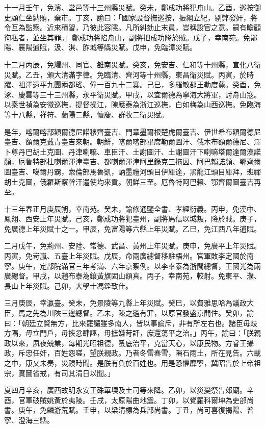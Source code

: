 \begin{pinyinscope}
十一月壬午，免濱、堂邑等十三州縣災賦。癸未，鄭成功將犯舟山。乙酉，巡按御史顧仁坐納賄，棄市。丁亥，諭曰：「國家設督撫巡按，振綱立紀，剔弊發奸，將令互為監察。近來積習，乃彼此容隱。凡所糾劾止末員，豈稱設官之意。嗣有瞻顧徇私者，並坐其罪。」鄭成功將陷舟山，副將把成功降於賊。戊子，幸南苑。免鄖陽、襄陽逋賦，汲、淇、胙城等縣災賦。戊申，免臨漳災賦。

十二月丙辰，免耀州、同官、雒南災賦。癸亥，免安吉、仁和等十州縣，宣化八衛災賦。乙丑，頒大清滿字律。免臨清、齊河等十州縣，東昌衛災賦。丙寅，於時躍、祖澤遠平九團兩都瑤、僮一百九十二寨。己巳，多羅敏郡王勒度薨。癸酉，免涿、慶雲等三十三州縣，永平衛災賦。甲戌，以宜爾德為寧海大將軍，討舟山寇。以秦世禎為安徽巡撫，提督操江，陳應泰為浙江巡撫，白如梅為山西巡撫。免臨海等十八縣，祥符、蘭陽二縣，懷慶、群牧二衛災賦。

是年，喀爾喀部額爾德尼諾穆齊臺吉、門章墨爾根楚虎爾臺吉、伊世希布額爾德尼臺吉、額爾克戴青臺吉來朝。朝鮮，喀爾喀部畢席勒爾圖汗、俄木布額爾德尼、澤卜尊丹巴胡土克圖、丹津喇嘛、車臣汗、土謝圖汗、土謝圖汗下喇嘛塔爾達爾漢諾顏，厄魯特部杜喇爾渾津臺吉、都喇爾渾津阿里錄克三拖因、阿巴賴諾顏、鄂齊爾圖臺吉、噶爾丹霸，索倫部馬魯凱，訥墨禮河頭目伊庫達，黑龍江頭目庫拜，班禪胡土克圖，俄羅斯察幹汗遣使均來貢。朝鮮三至。厄魯特阿巴賴、鄂齊爾圖臺吉再至。

十三年春正月庚辰朔，幸南苑。癸未，諭修通鑒全書、孝經衍義。丙申，免漢中、鳳翔、西安上年災賦。己亥，鄭成功將犯臺州，副將馬信以城叛，降於賊。庚子，免廣德上年災賦十之一。甲辰，免富陽等六縣上年災賦。乙巳，免江西八年逋賦。

二月戊午，免荊州、安陸、常德、武昌、黃州上年災賦。庚申，免廣平上年災賦。丙寅，免岢嵐、五臺上年災賦。戊辰，命兩廣總督移駐梧州。官軍敗李定國於南寧。庚午，定部院滿官三年考滿、六年京察例。以李率泰為浙閩總督，王國光為兩廣總督。甲戌，以趙布泰為鑲黃旗固山額真。丙子，幸南苑，較射。免東平、濮、長山上年災賦。己卯，大學士馮銓致仕。

三月庚辰，幸瀛臺。癸未，免景陵等九縣上年災賦。癸巳，以費雅思哈為議政大臣，馬之先為川陜三邊總督。乙未，陳之遴有罪，以原官發盛京閒住。癸卯，諭曰：「朝廷立賢無方，比來罷譴雖多南人，皆以事論斥，非有所左右也。諸臣毋歧方隅，毋立門戶，毋挾忿肆誣，毋摭嫌苛訐，庶還蕩平之治。」丙午，諭曰：「朕親政以來，夙夜兢業，每期光昭祖德，蚤底治平，克當天心，以康民物。方睿王攝政，斥忠任奸，百姓怨嗟，望朕親政。乃者冬雷春雪，隕石雨土，所在見告。六載之中，康乂未奏，災祲時聞。是朕有負於百姓也。用是恐懼靡寧，冀昭告於上帝祖宗，實圖省戒，有司其涓日以聞。」

夏四月辛亥，廣西故明永安王硃華堧及土司等來降。乙卯，以災變祭告郊廟。辛酉，官軍破賊姚黃於夷陵。壬戌，太原陽曲地震。丁卯，以覺羅科爾坤為吏部尚書。庚午，免麟游荒賦。壬申，以梁清標為兵部尚書。丁丑，尚可喜復揭陽、普寧、澄海三縣。


\end{pinyinscope}
